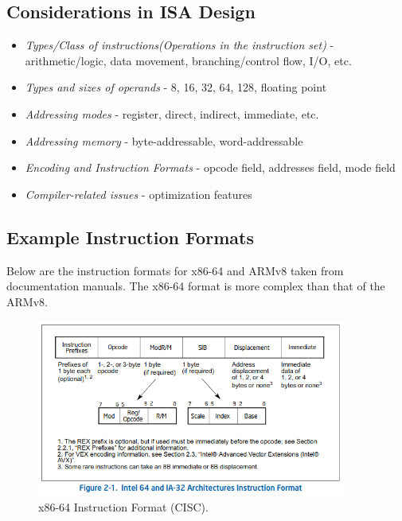\documentclass[a4paper, 11pt,oneside]{article}
\begin{document}
\subsection{Considerations in ISA Design}
\begin{itemize}
\item \textit{Types/Class of instructions(Operations in the instruction set)} - 
arithmetic/logic, data movement, branching/control flow, I/O, etc.
\item \textit{Types and sizes of operands} - 8, 16, 32, 64, 128, floating point
\item \textit{Addressing modes} - register, direct, indirect, immediate, etc.
\item \textit{Addressing memory} - byte-addressable, word-addressable
\item \textit{Encoding and Instruction Formats} - opcode field, addresses 
field, mode 
field
\item \textit{Compiler-related issues} - optimization features
\end{itemize}

\subsection{Example Instruction Formats}
Below are the instruction formats for x86-64 and ARMv8 taken from documentation 
manuals. The x86-64 format is more complex than that of the ARMv8.

\begin{figure}[H]
	\begin{center}
	\includegraphics[width=4in]{x86-64.png}
	\caption{x86-64 Instruction Format (CISC).}
	\label{fig:x86-64} 
	\end{center}
\end{figure}
\end{document}
